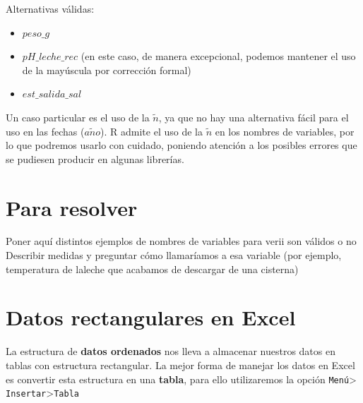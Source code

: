 \documentclass[
  letterpaper,
  DIV=11,
  numbers=noendperiod,
  oneside]{scrreprt}
\providecommand{\tightlist}{%
  \setlength{\itemsep}{0pt}\setlength{\parskip}{0pt}}\usepackage{longtable,booktabs,array}
\begin{document}
Alternativas válidas:

\begin{itemize}
\tightlist
\item
  \(peso\_g\)
\item
  \(pH\_leche\_rec\) (en este caso, de manera excepcional, podemos
  mantener el uso de la mayúscula por corrección formal)
\item
  \(est\_salida\_sal\)
\end{itemize}

Un caso particular es el uso de la \(\tilde{n}\), ya que no hay una
alternativa fácil para el uso en las fechas (\(a\tilde{n}o\)). R admite
el uso de la \(\tilde{n}\) en los nombres de variables, por lo que
podremos usarlo con cuidado, poniendo atención a los posibles errores
que se pudiesen producir en algunas librerías.

\hypertarget{para-resolver-1}{%
\section{Para resolver}\label{para-resolver-1}}

Poner aquí distintos ejemplos de nombres de variables para verii son
válidos o no Describir medidas y preguntar cómo llamaríamos a esa
variable (por ejemplo, temperatura de laleche que acabamos de descargar
de una cisterna)

\hypertarget{datos-rectangulares-en-excel}{%
\section{Datos rectangulares en
Excel}\label{datos-rectangulares-en-excel}}

La estructura de \textbf{datos ordenados} nos lleva a almacenar nuestros
datos en tablas con estructura rectangular. La mejor forma de manejar
los datos en Excel es convertir esta estructura en una \textbf{tabla},
para ello utilizaremos la opción \texttt{Menú}\textgreater{}
\texttt{Insertar}\textgreater{}\texttt{Tabla}
\end{document}
